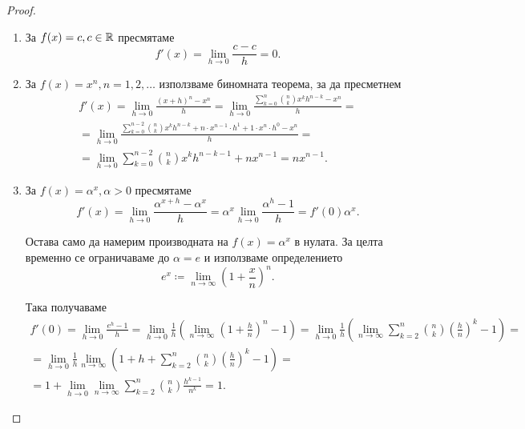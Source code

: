 \documentclass[numbers=endperiod, DIV=15, bibliography=totocnumbered]{scrartcl}
\begin{document}
\begin{proof}
  \mbox{}
  \begin{enumerate}
    \item За $f(x) = c, c \in \mathbb{R}$ пресмятаме
    \begin{displaymath}
      f'(x) = \lim_{h \to 0} \frac {c - c} h = 0.
    \end{displaymath}

    \item За $f(x) = x^n, n = 1, 2, \ldots$ използваме биномната теорема, за да пресметнем
    \begin{multline*}
      f'(x)
      =
      \lim_{h \to 0} \frac {{(x+h)}^n - x^n} h
      =
      \lim_{h \to 0} \frac {\sum_{k=0}^n {n \choose k} x^k h^{n-k} - x^n} h
      = \\ =
      \lim_{h \to 0} \frac {\sum_{k=0}^{n-2} {n \choose k} x^k h^{n-k} + n \cdot x^{n-1} \cdot h^1 + 1 \cdot x^n \cdot h^0 - x^n} h
      = \\ =
      \lim_{h \to 0} \sum_{k=0}^{n-2} {n \choose k} x^k h^{n-k-1} + n x^{n-1}
      =
      n x^{n-1}.
    \end{multline*}

    \item За $f(x) = \alpha^x, \alpha > 0$ пресмятаме
    \begin{displaymath}
      f'(x)
      =
      \lim_{h \to 0} \frac {\alpha^{x+h} - \alpha^x} h
      =
      \alpha^x \lim_{h \to 0} \frac {\alpha^h - 1} h
      =
      f'(0) \alpha^x.
    \end{displaymath}

    Остава само да намерим производната на $f(x) = \alpha^x$ в нулата. За целта временно се ограничаваме до $\alpha = e$ и използваме определението
    \begin{displaymath}
      e^x \coloneqq \lim_{n \to \infty} {\left( 1 + \frac x n \right)}^n.
    \end{displaymath}

    Така получаваме
    \begin{multline*}
      f'(0)
      =
      \lim_{h \to 0} \frac {e^h - 1} h
      =
      \lim_{h \to 0} \frac 1 h \left( \lim_{n \to \infty} {\left( 1 + \frac h n \right)}^n - 1 \right)
      =
      \lim_{h \to 0} \frac 1 h \left( \lim_{n \to \infty} \sum_{k=2}^n {n \choose k} {\left(\frac h n \right)}^k - 1 \right)
      = \\ =
      \lim_{h \to 0} \frac 1 h \lim_{n \to \infty} \left( 1 + h + \sum_{k=2}^n {n \choose k} {\left(\frac h n \right)}^k - 1 \right)
      = \\ =
      1 + \lim_{h \to 0} \lim_{n \to \infty} \sum_{k=2}^n {n \choose k} \frac {h^{k-1}} {n^k} = 1.
    \end{multline*}


\end{enumerate}
\end{proof}
\end{document}
